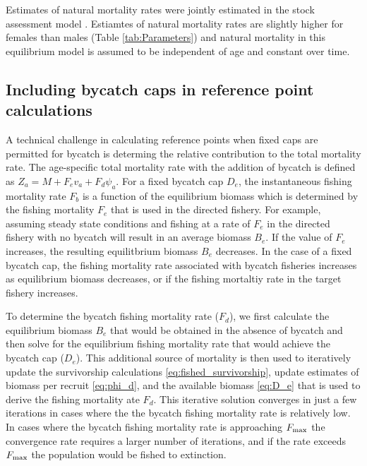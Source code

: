 \documentclass[12pt,leqno]{article}
\begin{document}
Estimates of natural mortality rates were jointly estimated in the stock assessment model \citep{stewartMartell2014}.  Estiamtes of natural mortality rates are slightly higher for females than males (Table \ref{tab:Parameters}) and natural mortality in this equilibrium model is assumed to be independent of age and constant over time.

\subsection*{Including bycatch caps in reference point calculations}
A technical challenge in calculating reference points when fixed caps are permitted for bycatch is determing the relative contribution to the total mortality rate.  The age-specific total mortality rate with the addition of bycatch is defined as $Z_a = M + F_e v_a + F_d \psi_a$.  For a fixed bycatch cap $D_e$, the instantaneous fishing mortality rate $F_b$ is a function of the equilibrium biomass which is determined by the fishing mortality $F_e$ that is used in the directed fishery.  For example, assuming steady state conditions and fishing at a rate of $F_e$ in the directed fishery with no bycatch will result in an average biomass $B_e$.  If the value of $F_e$ increases, the resulting equilitbrium biomass $B_e$ decreases.  In the case of a fixed bycatch cap, the fishing mortality rate associated with bycatch fisheries increases as equilibrium biomass decreases, or if the fishing mortaltiy rate in the target fishery increases.

To determine the bycatch fishing mortality rate ($F_d$), we first calculate the equilibrium biomass $B_e$ that would be obtained in the absence of bycatch and then solve for the equilibrium fishing mortality rate that would achieve the bycatch cap ($D_e$).  This additional source of mortality is then used to iteratively update the survivorship calculations \eqref{eq:fished_survivorship}, update estimates of biomass per recruit \eqref{eq:phi_d}, and the available biomass \eqref{eq:D_e} that is used to derive the fishing mortality ate $F_d$.  This iterative solution converges in just a few iterations in cases where the the bycatch fishing mortality rate is relatively low.  In cases where the bycatch fishing mortality rate is approaching $F_{\rm{max}}$  the convergence rate requires a larger number of iterations, and if the rate exceeds $F_{\rm{max}}$ the population would be fished to extinction.

%
%
\end{document}
